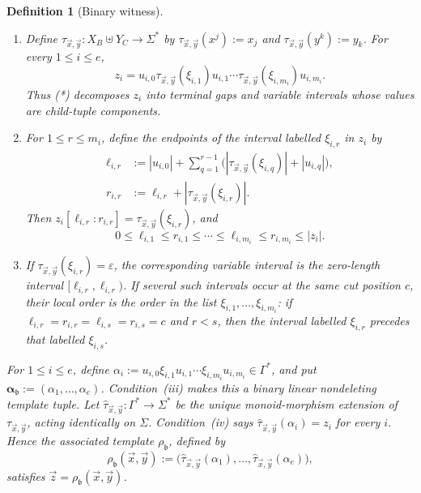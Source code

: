 \documentclass[11pt,a4paper]{article}
\newtheorem{definition}[theorem]{Definition}
\theoremstyle{remark}
\newcommand{\tuple}[1]{\vec{#1}}
\newcommand{\eps}{\varepsilon}
\begin{document}
\begin{definition}[Binary witness]
\begin{enumerate}[label=(\roman*),leftmargin=*]
\item Define \(\tau_{\tuple x,\tuple y}:X_B\uplus Y_C\to\Sigma^*\) by
      \(\tau_{\tuple x,\tuple y}(x^j):=x_j\) and
      \(\tau_{\tuple x,\tuple y}(y^k):=y_k\).  For every \(1\le i\le e\),
      \[
        z_i=u_{i,0}\tau_{\tuple x,\tuple y}(\xi_{i,1})u_{i,1}\cdots
        \tau_{\tuple x,\tuple y}(\xi_{i,m_i})u_{i,m_i}.
        \tag{*}
      \]
      Thus \textup{(*)} decomposes \(z_i\) into terminal gaps and variable
      intervals whose values are child-tuple components.

\item For \(1\le r\le m_i\), define the endpoints of the interval labelled
      \(\xi_{i,r}\) in \(z_i\) by
      \[
      \begin{aligned}
        \ell_{i,r}
        &:={}|u_{i,0}|+\sum_{q=1}^{r-1}
        \bigl(|\tau_{\tuple x,\tuple y}(\xi_{i,q})|+|u_{i,q}|\bigr),\\
        r_{i,r}
        &:={\ell_{i,r}}+|\tau_{\tuple x,\tuple y}(\xi_{i,r})|.
      \end{aligned}
      \]
      Then \(z_i[\ell_{i,r}:r_{i,r}]
      =\tau_{\tuple x,\tuple y}(\xi_{i,r})\), and
      \[
        0\le\ell_{i,1}\le r_{i,1}\le\cdots\le
        \ell_{i,m_i}\le r_{i,m_i}\le|z_i|.
      \]

\item If \(\tau_{\tuple x,\tuple y}(\xi_{i,r})=\eps\), the corresponding
      variable interval is the zero-length interval
      \([\ell_{i,r},\ell_{i,r})\).  If several such intervals occur at the
      same cut position \(c\), their local order is the order in the list
      \(\xi_{i,1},\ldots,\xi_{i,m_i}\): if
      \(\ell_{i,r}=r_{i,r}=\ell_{i,s}=r_{i,s}=c\) and \(r<s\), then the
      interval labelled \(\xi_{i,r}\) precedes that labelled \(\xi_{i,s}\).
\end{enumerate}

For \(1\le i\le e\), define
\(\alpha_i:=u_{i,0}\xi_{i,1}u_{i,1}\cdots
\xi_{i,m_i}u_{i,m_i}\in\Gamma^*\), and put
\(\boldsymbol\alpha_{\mathfrak b}:=(\alpha_1,\ldots,\alpha_e)\).
Condition~(iii) makes this a binary linear nondeleting template tuple.
Let \(\widehat\tau_{\tuple x,\tuple y}:\Gamma^*\to\Sigma^*\) be the unique
monoid-morphism extension of \(\tau_{\tuple x,\tuple y}\), acting identically
on \(\Sigma\).  Condition~(iv) says
\(\widehat\tau_{\tuple x,\tuple y}(\alpha_i)=z_i\) for every \(i\).  Hence the
associated template \(\rho_{\mathfrak b}\), defined by
\[
  \rho_{\mathfrak b}(\tuple x,\tuple y):=
  \bigl(\widehat\tau_{\tuple x,\tuple y}(\alpha_1),\ldots,
        \widehat\tau_{\tuple x,\tuple y}(\alpha_e)\bigr),
\]
satisfies \(\tuple z=\rho_{\mathfrak b}(\tuple x,\tuple y)\).
\end{definition}
\end{document}
